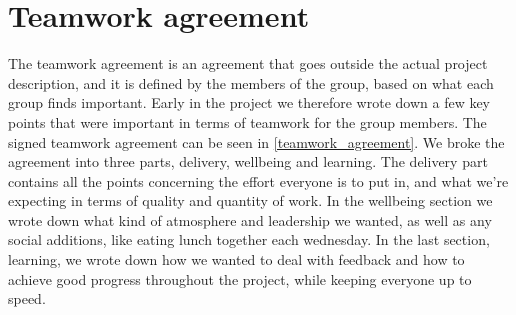 \section{Teamwork agreement}
The teamwork agreement is an agreement that goes outside the actual project description, and it is defined by the members of the group, based on what each group finds important. Early in the project we therefore wrote down a few key points that were important in terms of teamwork for the group members. The signed teamwork agreement can be seen in \autoref{teamwork_agreement}. We broke the agreement into three parts, delivery, wellbeing and learning. The delivery part contains all the points concerning the effort everyone is to put in, and what we're expecting in terms of quality and quantity of work. In the wellbeing section we wrote down what kind of atmosphere and leadership we wanted, as well as any social additions, like eating lunch together each wednesday. In the last section, learning, we wrote down how we wanted to deal with feedback and how to achieve good progress throughout the project, while keeping everyone up to speed.

